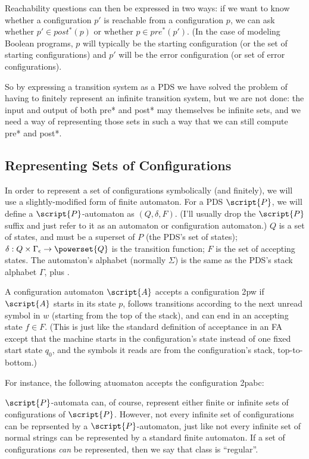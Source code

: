 \documentclass{article}
\newcommand{\config}{2}{\ensuremath{\langle #1, #2 \rangle}}
\begin{document}
\begin{defintion}
Reachability questions can then be expressed in two ways: if we want
to know whether a configuration $p'$ is reachable from a configuration
$p$, we can ask whether $p' \in post^*(p)$ or whether $p \in
pre^*(p')$. (In the case of modeling Boolean programs, $p$ will
typically be the starting configuration (or the set of starting
configurations) and $p'$ will be the error configuration (or set of
error configurations).

So by expressing a transition system as a PDS we have solved the
problem of having to finitely represent an infinite transition system,
but we are not done: the input and output of both pre* and post* may
themselves be infinite sets, and we need a way of representing those
sets in such a way that we can still compute pre* and post*.

\subsection{Representing Sets of Configurations}

In order to represent a set of configurations symbolically (and
finitely), we will use a slightly-modified form of finite
automaton. For a PDS $\script{P}$, we will define a
$\script{P}$-automaton as $(Q, \delta, F)$. (I'll usually drop the
$\script{P}$ suffix and just refer to it as an automaton or
configuration automaton.) $Q$ is a set of states, and must be a
superset of $P$ (the PDS's set of states); $\delta: Q \times
\Gamma_\epsilon \rightarrow \powerset{Q}$ is the transition function;
$F$ is the set of accepting states. The automaton's alphabet (normally
$\Sigma$) is the same as the PDS's stack alphabet $\Gamma$, plus
\epsilon.

A configuration automaton $\script{A}$ accepts a configuration
\config{p}{w} if $\script{A}$ starts in its state $p$, follows
transitions according to the next unread symbol in $w$ (starting from
the top of the stack), and can end in an accepting state $f \in
F$. (This is just like the standard definition of acceptance in an FA
except that the machine starts in the configuration's state instead of
one fixed start state $q_0$, and the symbols it reads are from the
configuration's stack, top-to-bottom.)

For instance, the following atuomaton accepts the configuration
\config{p}{abc}:



$\script{P}$-automata can, of course, represent either finite or
infinite sets of configurations of $\script{P}$. However, not every
infinite set of configurations can be reprsented by a
$\script{P}$-automaton, just like not every infinite set of normal
strings can be represented by a standard finite automaton. If a set of
configurations \emph{can} be represented, then we say that class is
``regular''.


\end{defintion}
\end{document}
